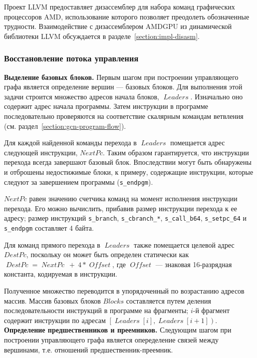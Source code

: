 \documentclass[a4paper,14pt]{extarticle}
\newcommand{\topic}[1]{\textbf{#1.}}
\newcommand{\var}[1]{\mathop{\mathit{#1}}}
\begin{document}
{Проект LLVM предоставляет дизассемблер для набора команд графических процессоров AMD,
использование которого позволяет преодолеть обозначенные трудности. Взаимодействие с
дизассемблером AMDGPU из динамической библиотеки LLVM обсуждается в разделе~\ref{section:impl-disasm}.

\subsubsection{Восстановление потока управления}

\topic{Выделение базовых блоков} Первым шагом при построении управляющего графа
является определение вершин — базовых блоков. Для выполнения этой задачи
строится множество адресов начала блоков, $\var{Leaders}$. Изначально
оно содержит адрес начала программы. Затем инструкции в программе
последовательно проверяются на соответствие скалярным командам ветвления
(см. раздел~\ref{section:gcn-program-flow}).

Для каждой найденной команды перехода в $\var{Leaders}$ помещается адрес следующей инструкции,
$NextPc$. Таким образом гарантируется, что инструкции перехода всегда завершают базовый
блок. Впоследствии могут быть обнаружены и отброшены недостижимые блоки, к примеру,
содержащие инструкции, которые следуют за завершением программы (\verb|s_endpgm|).

$NextPc$ равен значению счетчика команд на момент исполнения инструкции перехода.
Его можно вычислить, прибавив размер инструкции перехода к ее адресу; размер инструкций
\verb|s_branch|, \verb|s_cbranch_*|, \verb|s_call_b64|, \verb|s_setpc_64|
и \verb|s_endpgm| составляет 4 байта.

Для команд прямого перехода в $\var{Leaders}$ также помещается целевой адрес $DestPc$,
поскольку он может быть определен статически как $\var{DestPc} = \var{NextPc}\ +\ 4*\var{Offset}$,
где $\var{Offset}$ — знаковая 16-разрядная константа, кодируемая в инструкции.

Полученное множество переводится в упорядоченный по возрастанию адресов массив.
Массив базовых блоков $Blocks$ составляется путем деления последовательности инструкций
в программе на фрагменты; $i$-й фрагмент содержит инструкции по адресам
$\left[\var{Leaders}[i], \var{Leaders}[i+1]\right)$.\\

\topic{Определение предшественников и преемников} Следующим шагом при построении
управляющего графа является опеределение связей между вершинами, т.е. отношений
предшественник-преемник.

}
\end{document}
